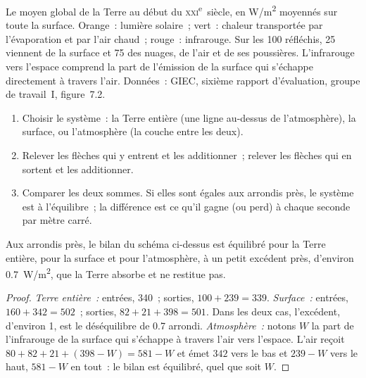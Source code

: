 \begin{omfigure}
{\small Le  moyen global de la Terre au début du
\textsc{xxi}\textsuperscript{e}~siècle, en \unit{W/m^2} moyennés sur toute
la surface. Orange~: lumière solaire~; vert~: chaleur transportée par
l'évaporation et par l'air chaud~; rouge~: infrarouge. Sur les 100
réfléchis, 25 viennent de la surface et 75 des nuages, de l'air et de ses
poussières. L'infrarouge vers l'espace comprend la part de l'émission de la
surface qui s'échappe directement à travers l'air. Données~: GIEC,
sixième rapport d'évaluation, groupe de travail~I, figure~7.2.}
\end{omfigure}

\begin{method}\label{met:g10:earth-energy-budget:reading}
\begin{enumerate}
  \item Choisir le système~: la Terre entière (une ligne au-dessus de
        l'atmosphère), la surface, ou l'atmosphère (la couche entre les
        deux).
  \item Relever les flèches qui y entrent et les additionner~; relever les
        flèches qui en sortent et les additionner.
  \item Comparer les deux sommes. Si elles sont égales aux arrondis près,
        le système est à l'équilibre~; la différence est ce qu'il gagne (ou
        perd) à chaque seconde par mètre carré.
\end{enumerate}
\end{method}

\begin{proposition}\label{prop:g10:earth-energy-budget:balance}
Aux arrondis près, le bilan du schéma ci-dessus est équilibré pour la Terre
entière, pour la surface et pour l'atmosphère, à un petit excédent près,
d'environ \qty{0.7}{W/m^2}, que la Terre absorbe et ne restitue pas.
\end{proposition}

\begin{proof}
\emph{Terre entière~:} entrées, 340~; sorties, $100 + 239 = 339$.
\emph{Surface~:} entrées, $160 + 342 = 502$~; sorties,
$82 + 21 + 398 = 501$. Dans les deux cas, l'excédent, d'environ 1, est le
déséquilibre de 0.7 arrondi. \emph{Atmosphère~:} notons $W$ la part de
l'infrarouge de la surface qui s'échappe à travers l'air vers l'espace.
L'air reçoit $80 + 82 + 21 + (398 - W) = 581 - W$ et émet $342$ vers le bas
et $239 - W$ vers le haut, $581 - W$ en tout~: le bilan est équilibré, quel
que soit $W$.
\end{proof}


